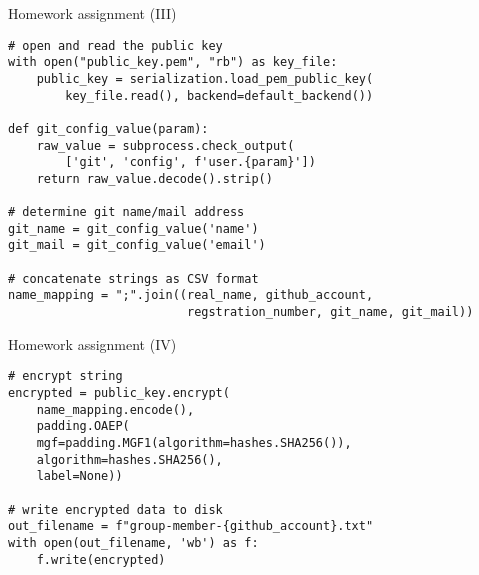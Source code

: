 \begin{frame}[fragile]{Homework assignment (III)}

	\begin{verbatim}
# open and read the public key
with open("public_key.pem", "rb") as key_file:
    public_key = serialization.load_pem_public_key(
        key_file.read(), backend=default_backend())

def git_config_value(param):
    raw_value = subprocess.check_output(
        ['git', 'config', f'user.{param}'])
    return raw_value.decode().strip()

# determine git name/mail address
git_name = git_config_value('name')
git_mail = git_config_value('email')

# concatenate strings as CSV format
name_mapping = ";".join((real_name, github_account,
                         regstration_number, git_name, git_mail))\end{verbatim}

\end{frame}

\begin{frame}[fragile]{Homework assignment (IV)}
	\begin{verbatim}
# encrypt string
encrypted = public_key.encrypt(
    name_mapping.encode(),
    padding.OAEP(
    mgf=padding.MGF1(algorithm=hashes.SHA256()),
    algorithm=hashes.SHA256(),
    label=None))

# write encrypted data to disk
out_filename = f"group-member-{github_account}.txt"
with open(out_filename, 'wb') as f:
    f.write(encrypted)\end{verbatim}
	\end{frame}


